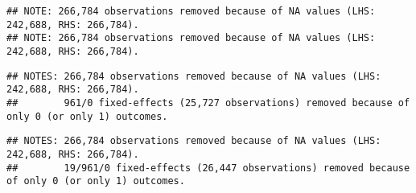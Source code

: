 \documentclass[
]{article}
\begin{document}
\begin{verbatim}
## NOTE: 266,784 observations removed because of NA values (LHS: 242,688, RHS: 266,784).
## NOTE: 266,784 observations removed because of NA values (LHS: 242,688, RHS: 266,784).
\end{verbatim}

\begin{verbatim}
## NOTES: 266,784 observations removed because of NA values (LHS: 242,688, RHS: 266,784).
##        961/0 fixed-effects (25,727 observations) removed because of only 0 (or only 1) outcomes.
\end{verbatim}

\begin{verbatim}
## NOTES: 266,784 observations removed because of NA values (LHS: 242,688, RHS: 266,784).
##        19/961/0 fixed-effects (26,447 observations) removed because of only 0 (or only 1) outcomes.
\end{verbatim}
\end{document}
